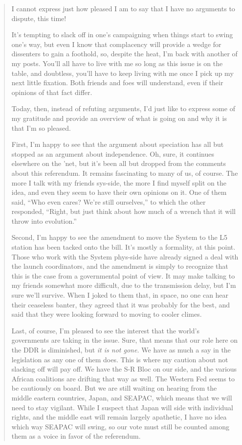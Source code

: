 \begin{quote}
I cannot express just how pleased I am to say that I have no arguments to dispute, this time!

It's tempting to slack off in one's campaigning when things start to swing one's way, but even I know that complacency will provide a wedge for dissenters to gain a foothold, so, despite the heat, I'm back with another of my posts. You'll all have to live with me so long as this issue is on the table, and doubtless, you'll have to keep living with me once I pick up my next little fixation. Both friends and foes will understand, even if their opinions of that fact differ.

Today, then, instead of refuting arguments, I'd just like to express some of my gratitude and provide an overview of what is going on and why it is that I'm so pleased.

First, I'm happy to see that the argument about speciation has all but stopped as an argument about independence. Oh, sure, it continues elsewhere on the 'net, but it's been all but dropped from the comments about this referendum. It remains fascinating to many of us, of course. The more I talk with my friends sys-side, the more I find myself split on the idea, and even they seem to have their own opinions on it. One of them said, ``Who even cares? We're still ourselves,'' to which the other responded, ``Right, but just think about how much of a wrench that it will throw into evolution.''

Second, I'm happy to see the amendment to move the System to the L5 station has been tacked onto the bill. It's mostly a formality, at this point. Those who work with the System phys-side have already signed a deal with the launch coordinators, and the amendment is simply to recognize that this is the case from a governmental point of view. It may make talking to my friends somewhat more difficult, due to the transmission delay, but I'm sure we'll survive. When I joked to them that, in space, no one can hear their ceaseless banter, they agreed that it was probably for the best, and said that they were looking forward to moving to cooler climes.

Last, of course, I'm pleased to see the interest that the world's governments are taking in the issue. Sure, that means that our role here on the DDR is diminished, but \emph{it is not gone.} We have as much a say in the legislation as any one of them does. This is where my caution about not slacking off will pay off. We have the S-R Bloc on our side, and the various African coalitions are drifting that way as well. The Western Fed seems to be cautiously on board. But we are still waiting on hearing from the middle eastern countries, Japan, and SEAPAC, which means that we will need to stay vigilant. While I suspect that Japan will side with individual rights, and the middle east will remain largely apathetic, I have no idea which way SEAPAC will swing, so our vote must still be counted among them as a voice in favor of the referendum.


\end{quote}
